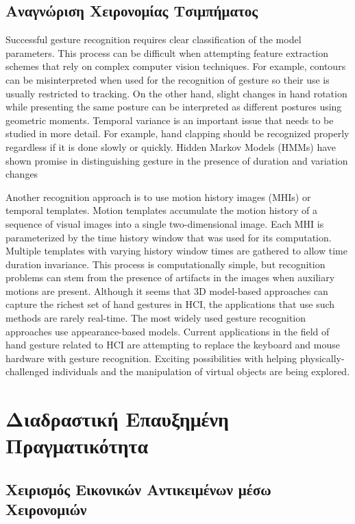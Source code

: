 \subsection{Αναγνώριση Χειρονομίας Τσιμπήματος}
Successful gesture recognition requires clear classification of the model parameters. This process can be difficult when attempting feature extraction schemes that rely on complex computer vision techniques. For example, contours can be misinterpreted when used for the recognition of gesture so their use is usually restricted to tracking. On the other hand, slight changes in hand rotation while presenting the same posture can be interpreted as different postures using geometric moments. Temporal variance is an important issue that needs to be studied in more detail. For example, hand clapping should be recognized properly regardless if it is done slowly or quickly. Hidden Markov Models (HMMs) have shown promise in distinguishing gesture in the presence of duration and variation changes

Another recognition approach is to use motion history images (MHIs) or temporal templates. Motion templates accumulate the motion history of a sequence of visual images into a single two-dimensional image. Each MHI is parameterized by the time history window that was used for its computation. Multiple templates with varying history window times are gathered to allow time duration invariance. This process is computationally simple, but recognition problems can stem from the presence of artifacts in the images when auxiliary motions are present. Although it seems that 3D model-based approaches can capture the richest set of hand gestures in HCI, the applications that use such methods are rarely real-time. The most widely used gesture recognition approaches use appearance-based models. Current applications in the field of hand gesture related to HCI are attempting to replace the keyboard and mouse hardware with gesture recognition. Exciting possibilities with helping physically-challenged individuals and the manipulation of virtual objects are being explored.



\section{Διαδραστική Επαυξημένη Πραγματικότητα}
\subsection{Χειρισμός Εικονικών Αντικειμένων μέσω Χειρονομιών}

